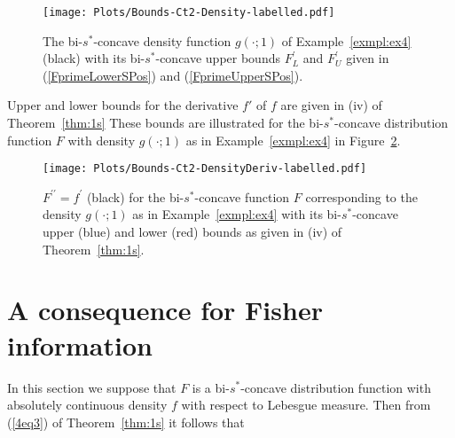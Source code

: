 \documentclass[11pt]{amsart}
\numberwithin{equation}{section}
\theoremstyle{definition}\newtheorem{definition}{Definition}
\theoremstyle{remark}\newtheorem{assumption}{Assumption}
\theoremstyle{remark}\newtheorem{remark}{Remark}
\theoremstyle{definition}\newtheorem{example}{Example}
\theoremstyle{plain}\newtheorem{question}{Question}
\theoremstyle{plain}\newtheorem{theorem}{Theorem}
\theoremstyle{plain}\newtheorem{lemma}{Lemma}
\theoremstyle{plain}\newtheorem{proposition}{Proposition}
\theoremstyle{plain}\newtheorem{corollary}{Corollary}
\theoremstyle{plain}\newtheorem{conjecture}{Conjecture}
\begin{document}
\begin{figure}[ht]
    \centering 
   \texttt{[image: Plots/Bounds-Ct2-Density-labelled.pdf]} 
    \caption{The bi-$s^*$-concave density function $g(\cdot; 1)$ of Example~\ref{exmpl:ex4} (black) with its 
    bi-$s^*$-concave  upper bounds $F_L^{\prime}$ and $F_U^{\prime}$ given in (\ref{FprimeLowerSPos}) and (\ref{FprimeUpperSPos}).}
     \label{fig:fig6}
 \end{figure}

Upper and lower bounds for the derivative $f'$ of $f$ are given in (iv) of Theorem~\ref{thm:1s} 
These bounds are illustrated for the bi-$s^*$-concave distribution function $F$ with density 
$g(\cdot ; 1)$ as in Example~\ref{exmpl:ex4} in Figure~\ref{fig:fig7}.
 
 \begin{figure}[ht]
    \centering
   \texttt{[image: Plots/Bounds-Ct2-DensityDeriv-labelled.pdf]} 
    \caption{$F^{\prime \prime} = f^{\prime}$ (black) for the bi-$s^*$-concave function $F$ corresponding to the 
    density $g(\cdot; 1)$ as in Example~\ref{exmpl:ex4}
    with its bi-$s^*$-concave 
     upper (blue) and lower (red) bounds  as given in (iv) of Theorem~\ref{thm:1s}.}
     \label{fig:fig7}
 \end{figure}
 \FloatBarrier
 
 \section{A consequence for Fisher information}
\label{sec:FisherInformation}
In this section we suppose that $F$ is a bi-$s^*$-concave distribution function with 
absolutely continuous density $f$ with respect to Lebesgue measure.   
Then from (\ref{4eq3}) of Theorem~\ref{thm:1s} it follows that 
\end{document}

